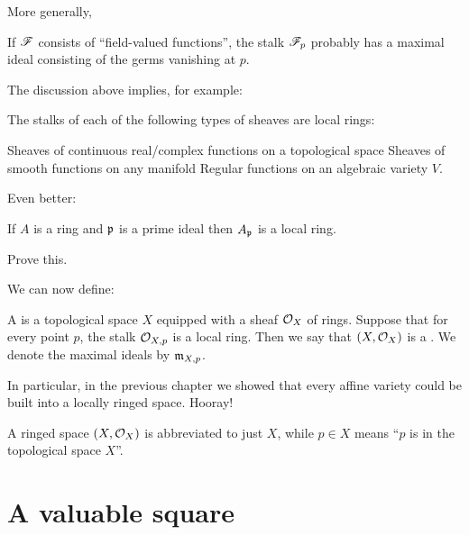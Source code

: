 More generally,
\begin{moral}
	If $\mathscr F$ consists of ``field-valued functions'',
	the stalk $\mathscr F_p$ probably has a maximal ideal
	consisting of the germs vanishing at $p$.
\end{moral}
The discussion above implies, for example:
\begin{proposition}
	The stalks of each of the following types of sheaves are local rings:
	\begin{enumerate}[(a)]
		\ii Sheaves of continuous real/complex functions on a topological space
		\ii Sheaves of smooth functions on any manifold
		\ii Regular functions on an algebraic variety $V$.
	\end{enumerate}
\end{proposition}
Even better:
\begin{theorem}
	If $A$ is a ring and $\mathfrak p$ is a prime ideal
	then $A_\mathfrak p$ is a local ring.
\end{theorem}
\begin{exercise}
	Prove this.
\end{exercise}

We can now define:
\begin{definition}
	A  is a topological space $X$ equipped
	with a sheaf $\mathcal O_X$ of rings.
	Suppose that for every point $p$, the stalk $\mathcal O_{X,p}$
	is a local ring.
	Then we say that $(X, \mathcal O_X)$ is a .
	We denote the maximal ideals by $\mathfrak m_{X,p}$.
\end{definition}

In particular, in the previous chapter we showed that every
affine variety could be built into a locally ringed space. Hooray!
\begin{abuse}
	A ringed space $(X, \mathcal O_X)$ is abbreviated to just $X$,
	while $p \in X$ means ``$p$ is in the topological space $X$''.
\end{abuse}


\section{A valuable square}

